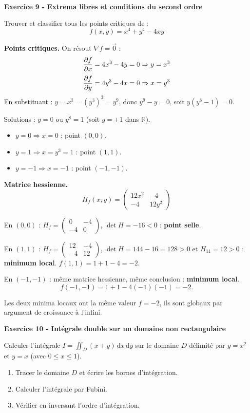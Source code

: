 \documentclass[12pt,a4paper]{article}
\begin{document}
\begin{boiteexercice}
\textbf{Exercice 9 - Extrema libres et conditions du second ordre}\niveau{\moyen}

Trouver et classifier tous les points critiques de :
\[
f(x,y) = x^4 + y^4 - 4xy
\]
\end{boiteexercice}

\begin{boitecorrige}
\textbf{Points critiques.} On résout $\nabla f = \vec{0}$ :
\[
\dfrac{\partial f}{\partial x} = 4x^3 - 4y = 0 \Rightarrow y = x^3
\]
\[
\dfrac{\partial f}{\partial y} = 4y^3 - 4x = 0 \Rightarrow x = y^3
\]
En substituant : $y = x^3 = (y^3)^3 = y^9$, donc $y^9 - y = 0$, soit $y(y^8-1) = 0$.

Solutions : $y = 0$ ou $y^8 = 1$ (soit $y = \pm1$ dans $\mathbb{R}$).
\begin{itemize}[nosep]
  \item $y = 0 \Rightarrow x = 0$ : point $(0,0)$.
  \item $y = 1 \Rightarrow x = y^3 = 1$ : point $(1,1)$.
  \item $y = -1 \Rightarrow x = -1$ : point $(-1,-1)$.
\end{itemize}

\textbf{Matrice hessienne.}
\[
H_f(x,y) = \begin{pmatrix}12x^2 & -4\\-4 & 12y^2\end{pmatrix}
\]

En $(0,0)$ : $H_f = \begin{pmatrix}0&-4\\-4&0\end{pmatrix}$, $\det H = -16 < 0$ : \textbf{point selle}.

En $(1,1)$ : $H_f = \begin{pmatrix}12&-4\\-4&12\end{pmatrix}$, $\det H = 144-16 = 128 > 0$ et $H_{11} = 12 > 0$ : \textbf{minimum local}. $f(1,1) = 1+1-4 = -2$.

En $(-1,-1)$ : même matrice hessienne, même conclusion : \textbf{minimum local}.
\[
f(-1,-1) = 1+1-4(-1)(-1) = -2.
\]

Les deux minima locaux ont la même valeur $f = -2$, ils sont globaux par argument de croissance à l'infini.
\end{boitecorrige}

\begin{boiteexercice}
\textbf{Exercice 10 - Intégrale double sur un domaine non rectangulaire}\niveau{\moyen}

Calculer l'intégrale $I = \displaystyle\iint_D (x+y)\,\mathrm{d}x\,\mathrm{d}y$ sur le domaine $D$ délimité par $y = x^2$ et $y = x$ (avec $0\leq x\leq1$).
\begin{enumerate}
  \item Tracer le domaine $D$ et écrire les bornes d'intégration.
  \item Calculer l'intégrale par Fubini.
  \item Vérifier en inversant l'ordre d'intégration.
\end{enumerate}
\end{boiteexercice}
\end{document}
